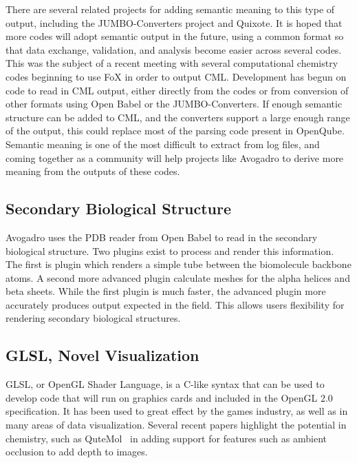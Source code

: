 \documentclass[10pt]{bmc_article}
\newenvironment{bmcformat}{\begin{raggedright}
\baselineskip20pt\sloppy\setboolean{publ}{false}}{\end{raggedright}
\baselineskip20pt\sloppy}
\begin{document}
\begin{bmcformat}
There are several related projects for adding semantic meaning to this type of output,
including the JUMBO-Converters project and Quixote. It is hoped that more codes
will adopt semantic output in the future, using a common format so that data exchange,
validation, and analysis become easier across several codes. This was the subject of
a recent meeting with several computational chemistry codes beginning to use FoX
in order to output CML. Development has begun on code to read in CML output,
either directly from the codes or from conversion of other formats using Open Babel
or the JUMBO-Converters. If enough semantic structure can be added to CML, and the
converters support a large enough range of the output, this could replace most of
the parsing code present in OpenQube. Semantic meaning is one of the most
difficult to extract from log files, and coming together as a community will help
projects like Avogadro to derive more meaning from the outputs of these codes.

\subsection{Secondary Biological Structure}

Avogadro uses the PDB reader from Open Babel to read in the secondary
biological structure. Two plugins exist to process and render this information.
The first is plugin which renders a simple tube between the biomolecule
backbone atoms. A second more advanced plugin calculate meshes for
the alpha helices and beta sheets. While the first plugin is much
faster, the advanced plugin more accurately produces output expected
in the field.  This allows users flexibility for rendering
secondary biological structures.

\subsection{GLSL, Novel Visualization}

GLSL, or OpenGL Shader Language, is a C-like syntax that can be used to develop
code that will run on graphics cards and included in the OpenGL 2.0
specification. It has been used to great effect by the games industry,
as well as in many areas of data visualization. Several recent papers
highlight the potential in chemistry, such as QuteMol~\cite{QuteMol}
in adding support for features such as ambient occlusion to add depth to images.


\end{bmcformat}
\end{document}
